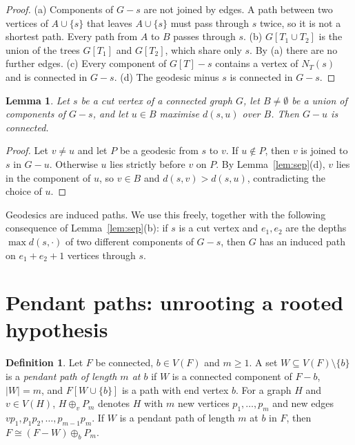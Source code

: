 \documentclass[11pt,a4paper]{article}
\newtheorem{lemma}[theorem]{Lemma}
\theoremstyle{definition}
\newtheorem{definition}[theorem]{Definition}
\newcommand{\plus}{\oplus}
\begin{document}
\begin{proof}
(a) Components of $G-s$ are not joined by edges. A path between two vertices of $A\cup\{s\}$ that leaves $A\cup\{s\}$ must pass through $s$ twice, so it is not a shortest path. Every path from $A$ to $B$ passes through $s$.
(b) $G[T_1\cup T_2]$ is the union of the trees $G[T_1]$ and $G[T_2]$, which share only $s$. By (a) there are no further edges.
(c) Every component of $G[T]-s$ contains a vertex of $N_T(s)$ and is connected in $G-s$.
(d) The geodesic minus $s$ is connected in $G-s$.
\end{proof}

\begin{lemma}\label{lem:farthest}
Let $s$ be a cut vertex of a connected graph $G$, let $B\neq\emptyset$ be a union of components of $G-s$, and let $u\in B$ maximise $d(s,u)$ over $B$. Then $G-u$ is connected.
\end{lemma}

\begin{proof}
Let $v\ne u$ and let $P$ be a geodesic from $s$ to $v$. If $u\notin P$, then $v$ is joined to $s$ in $G-u$. Otherwise $u$ lies strictly before $v$ on $P$. By Lemma~\ref{lem:sep}(d), $v$ lies in the component of $u$, so $v\in B$ and $d(s,v)>d(s,u)$, contradicting the choice of $u$.
\end{proof}

Geodesics are induced paths. We use this freely, together with the following consequence of Lemma~\ref{lem:sep}(b): if $s$ is a cut vertex and $e_1,e_2$ are the depths $\max d(s,\cdot)$ of two different components of $G-s$, then $G$ has an induced path on $e_1+e_2+1$ vertices through $s$.

\section{Pendant paths: unrooting a rooted hypothesis}\label{sec:pendant}

\begin{definition}
Let $F$ be connected, $b\in V(F)$ and $m\ge1$. A set $W\subseteq V(F)\setminus\{b\}$ is a \emph{pendant path of length $m$ at $b$} if $W$ is a connected component of $F-b$, $|W|=m$, and $F[W\cup\{b\}]$ is a path with end vertex $b$. For a graph $H$ and $v\in V(H)$, $H\plus_v P_m$ denotes $H$ with $m$ new vertices $p_1,\dots,p_m$ and new edges $vp_1,p_1p_2,\dots,p_{m-1}p_m$. If $W$ is a pendant path of length $m$ at $b$ in $F$, then $F\cong (F-W)\plus_b P_m$.
\end{definition}
\end{document}
